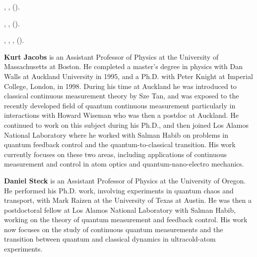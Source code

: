 \documentclass[12pt,aps,onecolum,superscriptaddress,footinbib,floatfix,showpacs]{revtex4-1}
\begin{document}
\begin{thebibliography}{85}
,
   \textbf{},
   ().

,
   \textbf{},
   ().

,
  ,
   ,
    ().

\end{thebibliography}

\onecolumngrid
\vspace{5mm}
\twocolumngrid  

\noindent
\textbf{Kurt Jacobs} is an Assistant Professor of Physics at the University of
Massachusetts at Boston.  He completed a master's degree in physics
with Dan Walls at Auckland University in 1995, and a Ph.D. with Peter
Knight at Imperial College, London, in 1998.  During his time at
Auckland he was introduced to classical continuous measurement theory
by Sze Tan, and was exposed to the recently developed field of quantum
continuous measurement particularly in interactions with Howard
Wiseman who was then a postdoc at Auckland.  He continued to work on
this subject during his Ph.D., and then joined Los Alamos National
Laboratory where he worked with Salman Habib on problems in quantum
feedback control and the quantum-to-classical transition.  His work
currently focuses on these two areas, including applications of
continuous measurement and control in atom optics and
quantum-nano-electro mechanics.

\noindent
\textbf{Daniel Steck} is an Assistant Professor of Physics at the University of
Oregon.  He performed his Ph.D. work, involving experiments in quantum
chaos and transport, with Mark Raizen at the University of Texas at
Austin.  He was then a postdoctoral fellow at Los Alamos National
Laboratory with Salman Habib, working on the theory of quantum
measurement and feedback control.  His work now focuses on the study
of continuous quantum measurements and the transition between quantum
and classical dynamics in ultracold-atom experiments.
\end{document}
